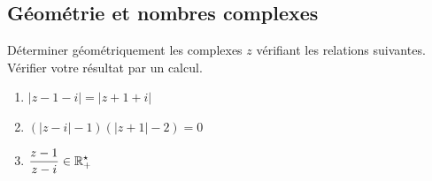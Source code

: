 \documentclass[a4paper, 11pt]{article}
\begin{document}
\vspace{0.5cm}

\subsection*{G\'eom\'etrie et nombres complexes}

\begin{exercice}  \;
	D\'eterminer g\'eom\'etriquement les complexes $z$ v\'erifiant les relations suivantes. V\'erifier votre r\'esultat par un calcul.
	\begin{enumerate}
		\item $|z-1-i| = |z+1+i|$
		\item $(|z-i|-1)(|z+1|-2)=0$
		\item $\displaystyle\frac{z-1}{z-i} \in \mathbb{R}_+^{\star}$
	\end{enumerate}
\end{exercice}
\end{document}
